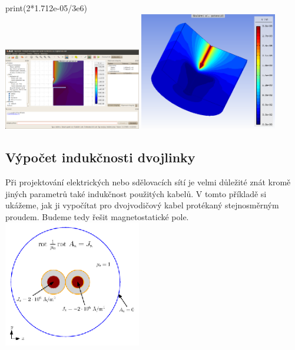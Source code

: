 \documentclass[a4paper, oneside]{article}
\begin{document}
print(2*1.712e-05/3e6)\\
\includegraphics[width=6cm]{Vypocet_kapacity.eps}
\includegraphics[width=6cm]{Potencial.eps}\\
\subsection{Výpočet indukčnosti dvojlinky}
Při projektování elektrických nebo sdělovacích sítí je velmi důležité znát kromě jiných parametrů také indukčnost použitých kabelů. V tomto příkladě si ukážeme, jak ji vypočítat pro dvojvodičový kabel protékaný stejnosměrným proudem. Budeme tedy řešit magnetostatické pole.\\
\includegraphics[width=6cm]{Matematicky_model_dvojlinky.eps}\\
\end{document}

